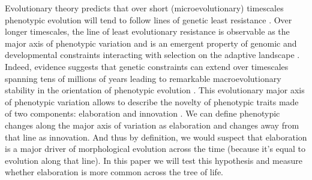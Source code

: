 \documentclass[12pt,letterpaper]{article}
\begin{document}
Evolutionary theory predicts that over short (microevolutionary) timescales phenotypic evolution will tend to follow lines of genetic least resistance \cite{schluter1996adaptive}.
Over longer timescales, the line of least evolutionary resistance is observable as the major axis of phenotypic variation \cite{marroig2005size,Rombaut2022} and is an emergent property of genomic and developmental constraints interacting with selection on the adaptive landscape \cite{jones2004evolution}.
Indeed, evidence suggests that genetic constraints can extend over timescales spanning tens of millions of years leading to remarkable macroevolutionary stability in the orientation of phenotypic evolution \cite{mcglothlin2018adaptive}.
This evolutionary major axis of phenotypic variation allows to describe the novelty of phenotypic traits made of two components: elaboration and innovation \cite{endler2005animal}.
We can define phenotypic changes along the major axis of variation as elaboration and changes away from that line as innovation.
And thus by definition, we would suspect that elaboration is a major driver of morphological evolution across the time (because it's equal to evolution along that line).
In this paper we will test this hypothesis and measure whether elaboration is more common across the tree of life.
\end{document}
